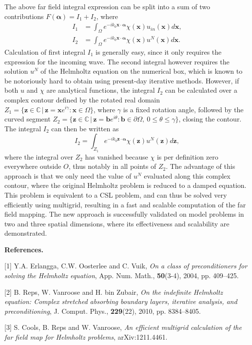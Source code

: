 \documentclass{report}
\begin{document}
The above far field integral expression can be split into a sum of two
contributions $F(\boldsymbol \alpha) = I_1 + I_2$, where
\begin{align}
I_1 &= \int_\Omega e^{-i k_0 \boldsymbol{x} \cdot \boldsymbol \alpha
}\chi(\boldsymbol{x})u_{in}(\boldsymbol{x}) d\boldsymbol{x}, \\
I_2 &= \int_\Omega e^{-i k_0 \boldsymbol{x} \cdot \boldsymbol \alpha }
\chi(\boldsymbol{x}) u^N(\boldsymbol{x}) d\boldsymbol{x}.
\end{align}
Calculation of first integral $I_1$ is generally easy, since it only
requires the expression for the incoming wave. The second integral
however requires the solution $u^N$ of the Helmholtz equation on the
numerical box, which is known to be notoriously hard to obtain using
present-day iterative methods. However, if both $u$ and $\chi$ are
analytical functions, the integral $I_2$ can be calculated over a complex
contour defined by the rotated real domain $Z_1 = \{\boldsymbol{z} \in
\mathbb{C} \,|\, \boldsymbol{z} = \boldsymbol{x} e^{i\gamma} :
\boldsymbol{x} \in \Omega \}$, where $\gamma$ is a fixed rotation angle,
followed by the curved segment $Z_2 = \{\boldsymbol{z} \in \mathbb{C}
\,|\, \boldsymbol{z} = \boldsymbol{b} e^{i\theta} : \boldsymbol{b} \in
\partial\Omega,~ 0 \leq \theta \leq \gamma\}$, closing the contour. The
integral $I_2$ can then be written as
\begin{equation}
I_2 = \int_{Z_1} e^{-i k_0 \boldsymbol{z} \cdot \boldsymbol \alpha
}\chi(\boldsymbol{z})u^N(\boldsymbol{z}) d\boldsymbol{z},
\end{equation}
where the integral over $Z_2$ has vanished because $\chi$ is per
definition zero everywhere outside $O$, thus notably in all points of
$Z_2$. The advantage of this approach is that we only need the value of
$u^N$ evaluated along this complex contour, where the original Helmholtz
problem is reduced to a damped equation. This problem is equivalent to a
CSL problem, and can thus be solved very efficiently using multigrid,
resulting in a fast and scalable computation of the far field mapping.
The new approach is successfully validated on model problems in two and
three spatial dimensions, where its effectiveness and scalability are
demonstrated.

\textbf{References.}

[1] Y.A. Erlangga, C.W. Oosterlee and C. Vuik, \textit{On a class of
preconditioners for solving the {H}elmholtz equation}, App. Num. Math.,
\textbf{50}(3-4), 2004, pp. 409--425.

[2] B. Reps, W. Vanroose and H. bin Zubair, \textit{On the indefinite
{H}elmholtz equation: {C}omplex stretched absorbing boundary layers,
iterative analysis, and preconditioning}, J. Comput. Phys.,
\textbf{229}(22), 2010, pp. 8384--8405.

[3] S. Cools, B. Reps and W. Vanroose, \textit{An efficient multigrid
calculation of the far field map for Helmholtz problems},
arXiv:1211.4461.
\end{document}

